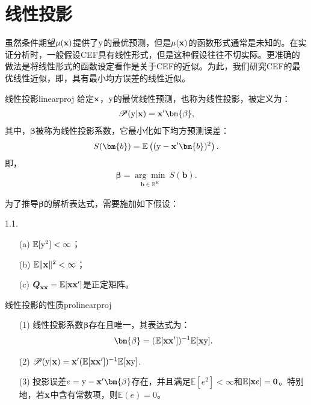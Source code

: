 \documentclass[cn,11pt,chinese]{elegantbook}
\begin{document}
\section{线性投影}
虽然条件期望$\mu(\bold{x})$提供了$\rm{y}$的最优预测，但是$\mu(\bold{x})$的函数形式通常是未知的。在实证分析时，一般假设CEF具有线性形式，但是这种假设往往不切实际。更准确的做法是将线性形式的函数设定看作是关于CEF的近似。为此，我们研究CEF的最优线性近似，即，具有最小均方误差的线性近似。
\begin{definition}{线性投影}{linearproj}
	给定$\bold{x}$，$\rm{y}$的最优线性预测，也称为线性投影，被定义为：
	\begin{eqnarray*}
		\mathscr{P}(\rm{y}|\bold{x})=\bold{x}'\bm{\beta},
	\end{eqnarray*}
	其中，$\bm{\beta}$被称为线性投影系数，它最小化如下均方预测误差：
	\begin{eqnarray*}
		S(\bm{b})=\mathbb{E}\left(({\rm{y}}-\bold{x}'\bm{b})^{2}\right).
	\end{eqnarray*}
	即，
	\begin{eqnarray*}
			\bm{\beta} = \underset{{\bm{b}}\in\mathbb{R}^{K}}{\arg\min}~S(\bm{b}).
	\end{eqnarray*}
\end{definition}
为了推导$\bm{\beta}$的解析表达式，需要施加如下假设：
\begin{assumption}{1.1.}
	\begin{itemize}
		\item[(a)] $\mathbb{E}[\rm{y}^{2}]<\infty$；
		\item[(b)] $\mathbb{E}\|\bold{x}\|^{2}<\infty$；
		\item[(c)] $\boldsymbol{Q}_{\bold{x}\bold{x}}=\mathbb{E}[\bold{x}\bold{x}']$是正定矩阵。
	\end{itemize}
\end{assumption}
\begin{theorem}{线性投影的性质}{prolinearproj}
	\begin{itemize}
		\item[(1)] 线性投影系数$\bm{\beta}$存在且唯一，其表达式为：
		\begin{eqnarray*}
			\bm{\beta} = (\mathbb{E}[\bold{x}\bold{x}'])^{-1}\mathbb{E}[\bold{x}\rm{y}].
		\end{eqnarray*}
		\item[(2)] $\mathscr{P}(\rm{y}|\bold{x})=\bold{x}'(\mathbb{E}[\bold{x}\bold{x}'])^{-1}\mathbb{E}[\bold{x}\rm{y}]$.
		\item[(3)] 投影误差$e=\rm{y}-\bold{x}'\bm{\beta}$存在，并且满足$\mathbb{E}[e^{2}]<\infty$和$\mathbb{E}[\bold{x}e]=\boldsymbol{0}$。特别地，若$\bold{x}$中含有常数项，则$\mathbb{E}(e)=0$。
	\end{itemize}
\end{theorem}
\end{document}
